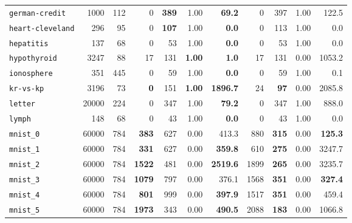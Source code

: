 \begin{tabular}{lccrrrrrrrr}
\texttt{german-credit} & \multicolumn{1}{r}{1000} & \multicolumn{1}{r}{112}  & 0 & \textbf{389} & 1.00 & \textbf{69.2} & 0 & 397 & 1.00 & 122.5\\
\texttt{heart-cleveland} & \multicolumn{1}{r}{296} & \multicolumn{1}{r}{95}  & 0 & \textbf{107} & 1.00 & \textbf{0.0} & 0 & 113 & 1.00 & 0.0\\
\texttt{hepatitis} & \multicolumn{1}{r}{137} & \multicolumn{1}{r}{68}  & 0 & 53 & 1.00 & \textbf{0.0} & 0 & 53 & 1.00 & 0.0\\
\texttt{hypothyroid} & \multicolumn{1}{r}{3247} & \multicolumn{1}{r}{88}  & 17 & 131 & \textbf{1.00} & \textbf{1.0} & 17 & 131 & 0.00 & 1053.2\\
\texttt{ionosphere} & \multicolumn{1}{r}{351} & \multicolumn{1}{r}{445}  & 0 & 59 & 1.00 & \textbf{0.0} & 0 & 59 & 1.00 & 0.1\\
\texttt{kr-vs-kp} & \multicolumn{1}{r}{3196} & \multicolumn{1}{r}{73}  & \textbf{0} & 151 & \textbf{1.00} & \textbf{1896.7} & 24 & \textbf{97} & 0.00 & 2085.8\\
\texttt{letter} & \multicolumn{1}{r}{20000} & \multicolumn{1}{r}{224}  & 0 & 347 & 1.00 & \textbf{79.2} & 0 & 347 & 1.00 & 888.0\\
\texttt{lymph} & \multicolumn{1}{r}{148} & \multicolumn{1}{r}{68}  & 0 & 43 & 1.00 & \textbf{0.0} & 0 & 43 & 1.00 & 0.0\\
\texttt{mnist\_0} & \multicolumn{1}{r}{60000} & \multicolumn{1}{r}{784}  & \textbf{383} & 627 & 0.00 & 413.3 & 880 & \textbf{315} & 0.00 & \textbf{125.3}\\
\texttt{mnist\_1} & \multicolumn{1}{r}{60000} & \multicolumn{1}{r}{784}  & \textbf{331} & 627 & 0.00 & \textbf{359.8} & 610 & \textbf{275} & 0.00 & 3247.7\\
\texttt{mnist\_2} & \multicolumn{1}{r}{60000} & \multicolumn{1}{r}{784}  & \textbf{1522} & 481 & 0.00 & \textbf{2519.6} & 1899 & \textbf{265} & 0.00 & 3235.7\\
\texttt{mnist\_3} & \multicolumn{1}{r}{60000} & \multicolumn{1}{r}{784}  & \textbf{1079} & 797 & 0.00 & 376.1 & 1568 & \textbf{351} & 0.00 & \textbf{327.4}\\
\texttt{mnist\_4} & \multicolumn{1}{r}{60000} & \multicolumn{1}{r}{784}  & \textbf{801} & 999 & 0.00 & \textbf{397.9} & 1517 & \textbf{351} & 0.00 & 459.4\\
\texttt{mnist\_5} & \multicolumn{1}{r}{60000} & \multicolumn{1}{r}{784}  & \textbf{1973} & 343 & 0.00 & \textbf{490.5} & 2088 & \textbf{183} & 0.00 & 1066.8\\

\end{tabular}
